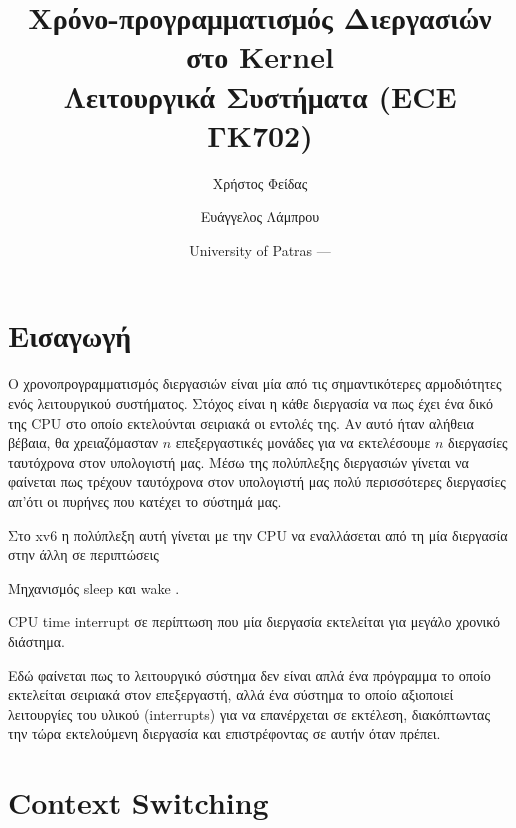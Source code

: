 \documentclass[18pt]{extarticle}
\title{Χρόνο-προγραμματισμός Διεργασιών στο \src{xv6} Kernel \\Λειτουργικά Συστήματα (ECE ΓΚ702)} %
\author{\footnotesize Χρήστος Φείδας\\ \footnotesize \src{fidas@upatras.gr} \and \footnotesize Ευάγγελος Λάμπρου\\ \footnotesize \src{e.lamprou@upnet.gr}} %
\date{University of Patras --- \the\year{}} %
\begin{document}
\pagestyle{fancy}
\fancyhf{} %
\renewcommand{\headrulewidth}{0pt}
\fancyhead{} %
\fancyfoot{} %
\fancyfoot[R]{\thepage}

\maketitle


\section{Εισαγωγή}

Ο χρονοπρογραμματισμός διεργασιών είναι μία από τις σημαντικότερες 
αρμοδιότητες ενός λειτουργικού συστήματος.
Στόχος είναι η κάθε διεργασία να  πως έχει ένα 
δικό της CPU στο οποίο εκτελούνται σειριακά οι εντολές της.
Αν αυτό ήταν αλήθεια βέβαια, θα χρειαζόμασταν $n$ επεξεργαστικές μονάδες 
για να εκτελέσουμε $n$ διεργασίες ταυτόχρονα στον υπολογιστή μας. 
Μέσω της πολύπλεξης διεργασιών γίνεται να φαίνεται πως τρέχουν ταυτόχρονα στον υπολογιστή μας
πολύ περισσότερες διεργασίες απ'ότι οι πυρήνες που κατέχει το σύστημά μας.

Στο xv6 η πολύπλεξη αυτή γίνεται με την CPU να εναλλάσεται από τη μία διεργασία
στην άλλη σε περιπτώσεις
\begin{enumerate*}
    \item Μηχανισμός sleep και wake \cite{OnlineSleepWake}.
    \item CPU time interrupt σε περίπτωση που μία διεργασία εκτελείται για μεγάλο χρονικό διάστημα.
\end{enumerate*}

Εδώ φαίνεται πως το λειτουργικό σύστημα δεν είναι απλά ένα πρόγραμμα το οποίο εκτελείται σειριακά στον επεξεργαστή, 
αλλά ένα σύστημα το οποίο αξιοποιεί λειτουργίες του υλικού (interrupts) για να επανέρχεται σε εκτέλεση, διακόπτωντας
την τώρα εκτελούμενη διεργασία και επιστρέφοντας σε αυτήν όταν πρέπει.

\section{Context Switching}
\end{document}
